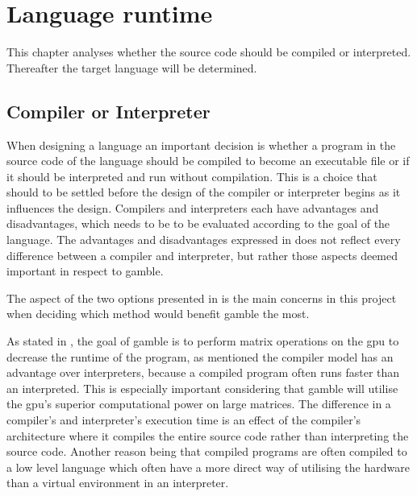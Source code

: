 \chapter{Language runtime}
This chapter analyses whether the source code should be compiled or interpreted.
Thereafter the target language will be determined. 

\section{Compiler or Interpreter}
When designing a language an important decision is whether a program in the source code of the language should be compiled to become an executable file or if it should be interpreted and run without compilation. 
This is a choice that should to be settled before the design of the compiler or interpreter begins as it influences the design. 
Compilers and interpreters each have advantages and disadvantages, which needs to be to be evaluated according to the goal of the language.
The advantages and disadvantages expressed in  does not reflect every difference between a compiler and interpreter, but rather those aspects deemed important in respect to \gls{gamble}.



The aspect of the two options presented in  is the main concerns in this project when deciding which method would benefit \gls{gamble} the most.

As stated in , the goal of \gls{gamble} is to perform matrix operations on the \acrshort{gpu} to decrease the runtime of the program, as mentioned the compiler model has an advantage over interpreters, because a compiled program often runs faster than an interpreted. 
This is especially important considering that \gls{gamble} will utilise the \acrshort{gpu}'s superior computational power on large matrices. 
The difference in a compiler's and interpreter's execution time is an effect of the compiler's architecture where it compiles the entire source code rather than interpreting the source code. 
Another reason being that compiled programs are often compiled to a low level language which often have a more direct way of utilising the hardware than a virtual environment in an interpreter.

